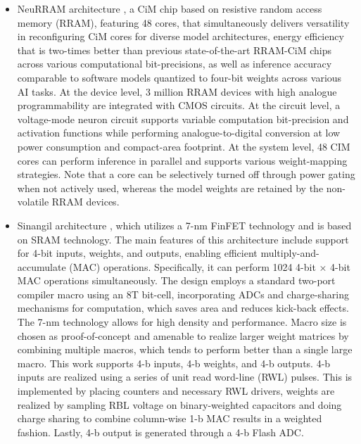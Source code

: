 \documentclass[conference]{IEEEtran}
\begin{document}
\begin{itemize}
    \item NeuRRAM architecture \cite{wan2022compute}, a CiM chip based on resistive random access memory (RRAM), featuring 48 cores, that simultaneously delivers versatility in reconfiguring CiM cores for diverse model architectures, energy efficiency that is two-times better than previous state-of-the-art RRAM-CiM chips across various computational bit-precisions, as well as inference accuracy comparable to software models quantized to four-bit weights across various AI tasks. At the device level, 3 million RRAM devices
    with high analogue programmability are integrated
    with CMOS circuits. At the circuit level, a voltage-mode neuron
    circuit supports variable computation bit-precision and activation functions while performing analogue-to-digital conversion at low
    power consumption and compact-area footprint. At the system
    level, 48 CIM cores can perform inference in parallel and supports
    various weight-mapping strategies. Note that a core can be selectively turned off through power gating when not actively used, whereas the model weights are retained by the non-volatile RRAM devices.

    \item Sinangil architecture \cite{sinangil20207}, which utilizes a 7-nm FinFET technology and is based on SRAM technology. The main features of this architecture include support for 4-bit inputs, weights, and outputs, enabling efficient multiply-and-accumulate (MAC) operations. Specifically, it can perform 1024 4-bit × 4-bit MAC operations simultaneously. The design employs a standard two-port compiler macro using an 8T bit-cell, incorporating ADCs and charge-sharing mechanisms for computation, which saves area and reduces kick-back effects. The 7-nm technology allows for high density and performance. Macro size is chosen as proof-of-concept and amenable to realize larger weight matrices by combining multiple macros, which tends to perform better than a single large macro. This work supports 4-b inputs, 4-b weights, and 4-b outputs. 4-b inputs are realized using a series of unit read word-line (RWL) pulses. This is implemented by placing  counters and necessary RWL drivers, weights are realized by sampling RBL voltage on binary-weighted capacitors and doing charge sharing to combine column-wise 1-b MAC results in a weighted fashion. Lastly, 4-b output is generated through a 4-b Flash ADC.


\end{itemize}
\end{document}
